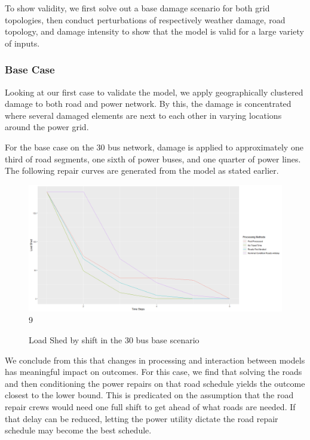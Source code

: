 \documentclass{article}
\begin{document}
	To show validity, we first solve out a base damage scenario for both grid topologies, then conduct perturbations of respectively weather damage, road topology, and damage intensity to show that the model is valid for a large variety of inputs. 
	
	\subsubsection{Base Case}
	Looking at our first case to validate the model, we apply geographically clustered damage to both road and power network. By this, the damage is concentrated where several damaged elements are next to each other in varying locations around the power grid. 
	
	For the base case on the 30 bus network, damage is applied to approximately one third of road segments, one sixth of power buses, and one quarter of power lines. The following repair curves are generated from the model as stated earlier. 
	
	\begin{figure}[H]
		\centering
		
			\centering
			\includegraphics[width=.9\linewidth]{Rplot37.png}9
			\caption{Load Shed by shift in the 30 bus base scenario}
			\label{fig:sub1}
		\end{figure}
	
	We conclude from this that changes in processing and interaction between models has meaningful impact on outcomes. For this case, we find that solving the roads and then conditioning the power repairs on that road schedule yields the outcome closest to the lower bound. This is predicated on the assumption that the road repair crews would need one full shift to get ahead of what roads are needed. If that delay can be reduced, letting the power utility dictate the road repair schedule may become the best schedule.
	
\end{document}
